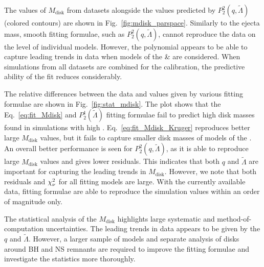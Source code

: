 The values of $M_{\text{disk}}$ from datasets alongside the values predicted by $P_2^2(q,\tilde{\Lambda})$ (colored contours) are shown in Fig.~\ref{fig:mdisk_parspace}.
Similarly to the ejecta mass, smooth fitting formulae, such as $P_2^2(q,\tilde{\Lambda})$, 
cannot reproduce the data on the level of individual models. However, the 
polynomial appears to be able to capture leading trends in data when 
models of the \DSrefset{} \& \DSheatcool{} are considered.
When simulations from all datasets are combined for the calibration, 
the predictive ability of the fit reduces considerably.

The relative differences between the data and values given by various fitting formulae are 
shown in Fig.~\ref{fig:stat_mdisk}.
%
The plot shows that the Eq.~\eqref{eq:fit_Mdisk} and $P_2^1(\tilde{\Lambda})$ fitting 
formulae fail to predict high disk masses found in simulations with high \mr{}. 
Eq.~\eqref{eq:fit_Mdisk_Kruger} reproduces better large $M_{\text{disk}}$ values,  
but it fails to capture smaller disk masses of models of the \DSnone{}.
%
An overall better performance is seen for $P_2^2(q,\tilde{\Lambda})$, as it is able 
to reproduce large $M_{\text{disk}}$ values and gives lower residuals.
This indicates that both $q$ and $\tilde{\Lambda}$ are important for capturing
the leading trends in $M_{\text{disk}}$.
However, we note that both residuals and $\chi_{\nu}^2$ for all fitting models are large.
With the currently available data, fitting formulae are able to reproduce 
the simulation values within an order of magnitude only.

The statistical analysis of the $M_{\text{disk}}$ highlights large systematic 
and method-of-computation uncertainties. 
%
The leading trends in data appears to be given 
by the $q$ and $\tilde{\Lambda}$. 
%
However, a larger sample of models and 
separate analysis of disks around \ac{BH} and \ac{NS} remnants are required 
to improve the fitting formulae and investigate the statistics more thoroughly. 



